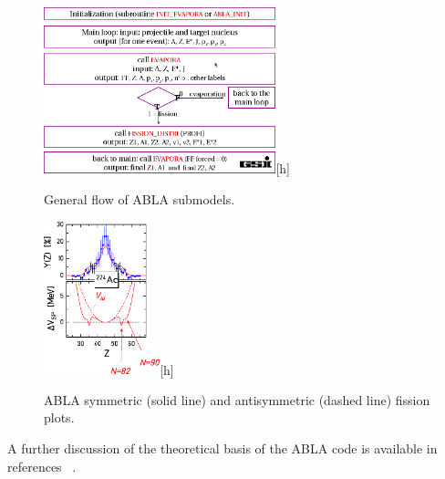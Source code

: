 \begin{figure}[h] 
\begin{center}
\includegraphics[width=0.6\textwidth]{images/AblaTable.png}[h]  
\caption{\label{fig:ablatable} General flow of ABLA submodels.}
 
 \end{center}
 \end{figure}
\begin{figure}[h] 
\begin{center}
\includegraphics[width=0.3\textwidth]{images/AblaHumps.png}[h]  
\caption{\label{fig:ablahumps} ABLA symmetric (solid line) and antisymmetric (dashed line) fission plots.}
 
 \end{center}
 \end{figure}

A further discussion of the theoretical basis of the ABLA code is available in references ~\cite{ablatalk,iia}.

\clearpage


  









